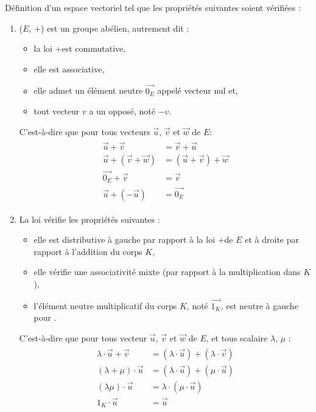 \documentclass[a4paper]{article}
\begin{document}
\begin{parag}{Définition d'un espace vectoriel}
		tel que les propriétés suivantes soient vérifiées :
		\begin{enumerate}
			\item ($E$, $+$) est un groupe abélien, autrement dit :
			\begin{itemize}
				\item la loi \guillemotleft+\guillemotright est commutative,
				\item elle est associative,
				\item elle admet un élément neutre $\vec{0_E}$ appelé vecteur nul et, 
				\item tout vecteur $v$ a un opposé, noté  $-v$.
			\end{itemize}
			C'est-à-dire que pour tous vecteurs $\vec{u}$, $\vec{v}$ et $\vec{w}$ de $E$:
			\begin{align}
			\begin{split}
				\vec{u} + \vec{v} &= \vec{v} + \vec{u} \\
				\vec{u} + (\vec{v} + \vec{w}) &= (\vec{u} + \vec{v}) + \vec{w} \\
				\vec{0_E} + \vec{v} &= \vec{v} \\
				\vec{u} + (-\vec{u}) &= \vec{0_E}
			\end{split}
			\end{align}
		\item La loi \guillemotleft\cdot\guillemotright vérifie les propriétés suivantes :
			\begin{itemize}
				\item elle est distributive à gauche par rapport à la loi \guillemotleft+\guille de $E$ et à droite par rapport à l'addition du corps  $K$,
				\item elle vérifie une associativité mixte (par rapport à la multiplication dans $K$),
				\item l'élément neutre multiplicatif du corps $K$, noté  $\vec{1_K}$, est neutre à gauche pour \cdot.
			\end{itemize}
			C'est-à-dire que pour tous vecteur $\vec{u}$,  $\vec{v}$ et  $\vec{w}$ de  $E$, et tous scalaire $\lambda$, $\mu$ :
			\begin{align}
			\begin{split}
				\lambda \cdot \vec{u} + \vec{v} &= (\lambda \cdot \vec{u}) + (\lambda \cdot \vec{v}) \\
				(\lambda + \mu) \cdot \vec{u} &= (\lambda \cdot \vec{u}) + (\mu \cdot \vec{u}) \\
				(\lambda\mu) \cdot \vec{u} &= \lambda \cdot (\mu \cdot \vec{u}) \\
				1_K \cdot \vec{u} &= \vec{u}
			\end{split}
			\end{align}
		\end{enumerate}


\end{parag}
\end{document}
